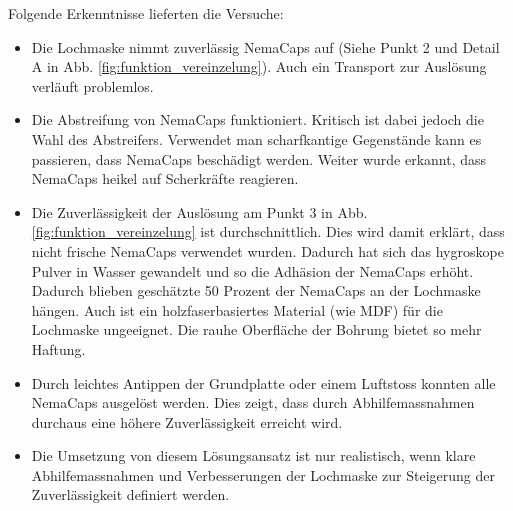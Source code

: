 Folgende Erkenntnisse lieferten die Versuche:
\begin{itemize}
	\item Die Lochmaske nimmt zuverlässig NemaCaps auf (Siehe Punkt 2 und Detail A in Abb. \ref{fig:funktion_vereinzelung}). Auch ein Transport zur Auslösung verläuft problemlos.
	
	\item Die Abstreifung von NemaCaps funktioniert. Kritisch ist dabei jedoch die Wahl des Abstreifers. Verwendet man scharfkantige Gegenstände kann es passieren, dass NemaCaps beschädigt werden. Weiter wurde erkannt, dass NemaCaps heikel auf Scherkräfte reagieren.
		
	\item Die Zuverlässigkeit der Auslösung am Punkt 3 in Abb. \ref{fig:funktion_vereinzelung} ist durchschnittlich. Dies wird damit erklärt, dass nicht frische NemaCaps verwendet wurden. Dadurch hat sich das hygroskope Pulver in Wasser gewandelt und so die Adhäsion der NemaCaps erhöht. Dadurch blieben geschätzte 50 Prozent der NemaCaps an der Lochmaske hängen. Auch ist ein holzfaserbasiertes Material (wie MDF) für die Lochmaske ungeeignet. Die rauhe Oberfläche der Bohrung bietet so mehr Haftung.
	
	\item Durch leichtes Antippen der Grundplatte oder einem Luftstoss konnten alle NemaCaps ausgelöst werden. Dies zeigt, dass durch Abhilfemassnahmen durchaus eine höhere Zuverlässigkeit erreicht wird.
	
	\item Die Umsetzung von diesem Lösungsansatz ist nur realistisch, wenn klare Abhilfemassnahmen und Verbesserungen der Lochmaske zur Steigerung der Zuverlässigkeit definiert werden. 
\end{itemize} 


